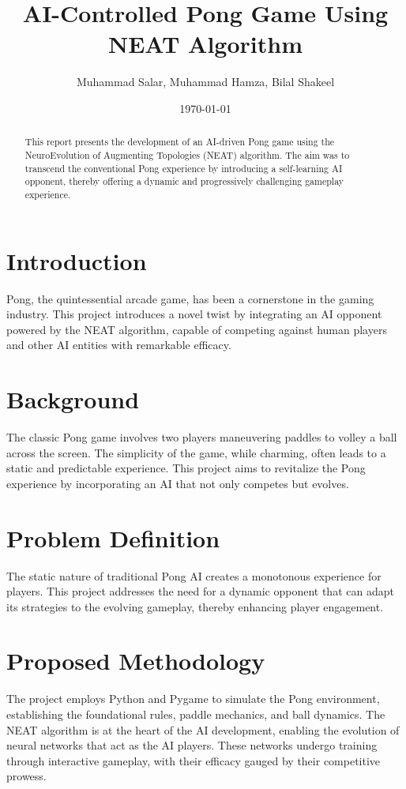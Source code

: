 \documentclass[10pt]{article}
\begin{document}
\tableofcontents
\title{AI-Controlled Pong Game Using NEAT Algorithm}
\author{Muhammad Salar, Muhammad Hamza, Bilal Shakeel}
\date{\today}
\maketitle

\begin{abstract}
This report presents the development of an AI-driven Pong game using the NeuroEvolution of Augmenting Topologies (NEAT) algorithm. The aim was to transcend the conventional Pong experience by introducing a self-learning AI opponent, thereby offering a dynamic and progressively challenging gameplay experience.
\end{abstract}

\section{Introduction}
Pong, the quintessential arcade game, has been a cornerstone in the gaming industry. This project introduces a novel twist by integrating an AI opponent powered by the NEAT algorithm, capable of competing against human players and other AI entities with remarkable efficacy.

\section{Background}
The classic Pong game involves two players maneuvering paddles to volley a ball across the screen. The simplicity of the game, while charming, often leads to a static and predictable experience. This project aims to revitalize the Pong experience by incorporating an AI that not only competes but evolves.

\section{Problem Definition}
The static nature of traditional Pong AI creates a monotonous experience for players. This project addresses the need for a dynamic opponent that can adapt its strategies to the evolving gameplay, thereby enhancing player engagement.

\section{Proposed Methodology}
The project employs Python and Pygame to simulate the Pong environment, establishing the foundational rules, paddle mechanics, and ball dynamics. The NEAT algorithm is at the heart of the AI development, enabling the evolution of neural networks that act as the AI players. These networks undergo training through interactive gameplay, with their efficacy gauged by their competitive prowess.
\end{document}
